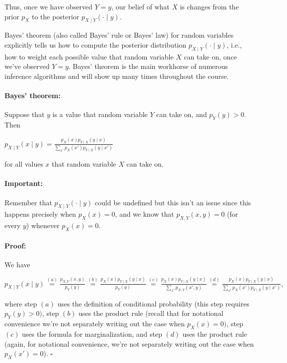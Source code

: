 \documentclass[6008notes.tex]{subfiles}
\begin{document}
Thus, once we have observed $Y=y$, our belief of what $X$ is changes from the prior $p_X$ to the posterior $p_{X\mid Y}(\cdot \mid y)$.

Bayes' theorem (also called Bayes' rule or Bayes' law) for random variables explicitly tells us how to compute the posterior distribution $p_{X\mid Y}(\cdot \mid y)$, i.e., how to weight each possible value that random variable $X$ can take on, once we've observed $Y=y$. Bayes' theorem is the main workhorse of numerous inference algorithms and will show up many times throughout the course.

\paragraph{Bayes' theorem:} Suppose that $y$ is a value that random variable $Y$ can take on, and $p_{Y}(y)>0$. Then

{\centering$p_{X\mid Y}(x\mid y)=\frac{p_{X}(x)p_{Y\mid X}(y\mid x)}{\sum _{ x'}p_{X}( x')p_{Y\mid X}(y\mid x')}$ \par}
 
for all values $x$ that random variable $X$ can take on.

\paragraph{Important:} Remember that $p_{X\mid Y}(\cdot \mid y)$ could be undefined but this isn't an issue since this happens precisely when $p_X(x)=0$, and we know that $p_{X,Y}(x,y)=0$ (for every $y$) whenever $p_X(x)=0$.

\paragraph{Proof:} We have

{\centering$p_{X\mid Y}(x\mid y)\overset {(a)}{=}\frac{p_{X,Y}(x,y)}{p_{Y}(y)}\overset {(b)}{=}\frac{p_{X}(x)p_{Y\mid X}(y\mid x)}{p_{Y}(y)}\overset {(c)}{=}\frac{p_{X}(x)p_{Y\mid X}(y\mid x)}{\sum _{ x'}p_{X,Y}( x',y)}\overset {(d)}{=}\frac{p_{X}(x)p_{Y\mid X}(y\mid x)}{\sum _{ x'}p_{X}( x')p_{Y\mid X}(y\mid x')},$ \par}
 
where step $(a)$ uses the definition of conditional probability (this step requires $p_Y(y)>0)$, step $(b)$ uses the product rule (recall that for notational convenience we're not separately writing out the case when $p_X(x)=0)$, step $(c)$ uses the formula for marginalization, and step $(d)$ uses the product rule (again, for notational convenience, we're not separately writing out the case when $p_X(x')=0$). $\square$
\end{document}
